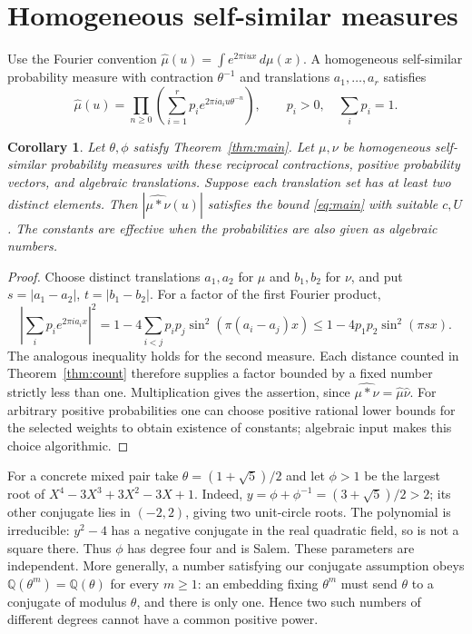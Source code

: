 \documentclass[11pt]{article}
\newtheorem{corollary}[theorem]{Corollary}
\newcommand{\Q}{\mathbb Q}
\begin{document}
\section{Homogeneous self-similar measures}
Use the Fourier convention $\widehat\mu(u)=\int e^{2\pi iux}\,d\mu(x)$.
A homogeneous self-similar probability measure with contraction
$\theta^{-1}$ and translations $a_1,\ldots,a_r$ satisfies
\[
 \widehat\mu(u)=\prod_{n\geq0}
       \left(\sum_{i=1}^r p_i e^{2\pi i a_i u\theta^{-n}}\right),
 \qquad p_i>0,\quad\sum_i p_i=1.
\]
\begin{corollary}\label{cor:measures}
Let $\theta,\phi$ satisfy Theorem~\ref{thm:main}. Let $\mu,\nu$
be homogeneous self-similar probability measures with these reciprocal
contractions, positive probability vectors, and algebraic translations.
Suppose each translation set has at least two distinct elements.
Then $|\widehat{\mu*\nu}(u)|$ satisfies the bound \eqref{eq:main}
with suitable $c,U$. The constants are effective when the probabilities
are also given as algebraic numbers.
\end{corollary}
\begin{proof}
Choose distinct translations $a_1,a_2$ for $\mu$ and $b_1,b_2$ for
$\nu$, and put $s=|a_1-a_2|$, $t=|b_1-b_2|$.
For a factor of the first Fourier product,
\[
 \left|\sum_i p_i e^{2\pi i a_i x}\right|^2
 =1-4\sum_{i<j}p_ip_j\sin^2(\pi(a_i-a_j)x)
 \leq1-4p_1p_2\sin^2(\pi sx).
\]
The analogous inequality holds for the second measure. Each distance
counted in Theorem~\ref{thm:count} therefore supplies a factor bounded
by a fixed number strictly less than one. Multiplication gives the
assertion, since $\widehat{\mu*\nu}=\widehat\mu\widehat\nu$.
For arbitrary positive probabilities one can choose positive rational
lower bounds for the selected weights to obtain existence of constants;
algebraic input makes this choice algorithmic.
\end{proof}

For a concrete mixed pair take $\theta=(1+\sqrt5)/2$ and let $\phi>1$
be the largest root of $X^4-3X^3+3X^2-3X+1$.
Indeed, $y=\phi+\phi^{-1}=(3+\sqrt5)/2>2$; its other conjugate lies
in $(-2,2)$, giving two unit-circle roots. The polynomial is irreducible:
$y^2-4$ has a negative conjugate in the real quadratic field, so is not
a square there. Thus $\phi$ has degree four and is Salem.
These parameters are independent. More generally, a number satisfying
our conjugate assumption obeys $\Q(\theta^m)=\Q(\theta)$ for every
$m\geq1$: an embedding fixing $\theta^m$ must send $\theta$ to a
conjugate of modulus $\theta$, and there is only one. Hence two such
numbers of different degrees cannot have a common positive power.
\end{document}
